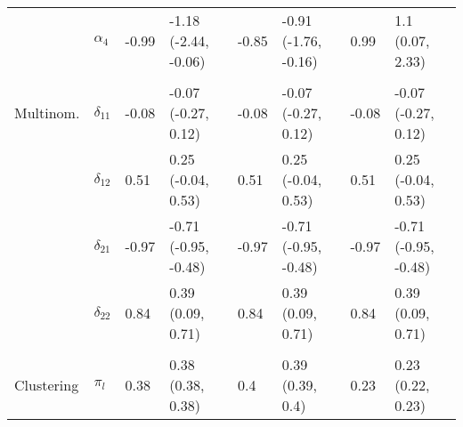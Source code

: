 \documentclass[]{article}
\begin{document}
\begin{table}[t]
\begin{tabular}{llllllll}
\hspace{1em} & $\alpha_{4}$ & -0.99 & -1.18 (-2.44, -0.06) & -0.85 & -0.91 (-1.76, -0.16) & 0.99 & 1.1 (0.07, 2.33)\\
\addlinespace[0.3em]
\multicolumn{8}{l}{\textbf{ }}\\
\hspace{1em}Multinom. & $\delta_{11}$ & -0.08 & -0.07 (-0.27, 0.12) & -0.08 & -0.07 (-0.27, 0.12) & -0.08 & -0.07 (-0.27, 0.12)\\
\hspace{1em} & $\delta_{12}$ & 0.51 & 0.25 (-0.04, 0.53) & 0.51 & 0.25 (-0.04, 0.53) & 0.51 & 0.25 (-0.04, 0.53)\\
\hspace{1em} & $\delta_{21}$ & -0.97 & -0.71 (-0.95, -0.48) & -0.97 & -0.71 (-0.95, -0.48) & -0.97 & -0.71 (-0.95, -0.48)\\
\hspace{1em} & $\delta_{22}$ & 0.84 & 0.39 (0.09, 0.71) & 0.84 & 0.39 (0.09, 0.71) & 0.84 & 0.39 (0.09, 0.71)\\
\addlinespace[0.3em]
\multicolumn{8}{l}{\textbf{ }}\\
\hspace{1em}Clustering & $\pi_l$ & 0.38 & 0.38 (0.38, 0.38) & 0.4 & 0.39 (0.39, 0.4) & 0.23 & 0.23 (0.22, 0.23)\\
\bottomrule
\end{tabular}
\end{table}
\end{document}
